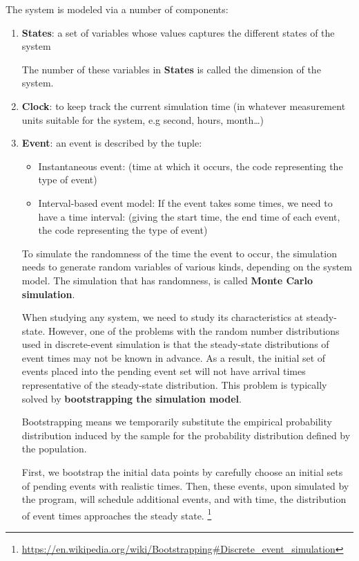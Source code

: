 The system is modeled via a number of components:
\begin{enumerate}
  \item {\bf States}: a set of variables whose values captures the different
  states of the system
  
  The number of these variables in {\bf States} is called the dimension of the
  system.
  
  \item {\bf Clock}:
  to keep track the current simulation time (in whatever measurement units
  suitable for the system, e.g second, hours, month\ldots)
   
  \item {\bf Event}: an event is described by the tuple: 
  \begin{itemize}
    \item Instantaneous event: (time at which it
  occurs, the code representing the type of event)
  
    \item Interval-based event model: 
    If the event takes some times, we need to
    have a time interval:
  (giving the start time, the end time of each event, the code representing the
  type of event)
  \end{itemize}
  
  To simulate the randomness of the time the event to occur, the simulation
  needs to generate random variables of various kinds, depending on the system
  model. The simulation that has randomness, is called {\bf Monte Carlo
  simulation}.
  
  When studying any system, we need to study its characteristics at
  steady-state. However, one of the problems with the random number
  distributions used in discrete-event simulation is that the steady-state
  distributions of event times may not be known in advance. As a result, the
  initial set of events placed into the pending event set will not have arrival
  times representative of the steady-state distribution. This problem is
  typically solved by {\bf bootstrapping the simulation model}.
  
  Bootstrapping means we temporarily substitute the empirical probability
  distribution induced by the sample for the probability distribution defined by
  the population.
  
  First, we bootstrap the initial data points by carefully choose an initial
  sets of pending events with realistic times. Then, these events, upon
  simulated by the program, will schedule additional events, and with time, the
  distribution of event times approaches the steady state.
  \footnote{\url{https://en.wikipedia.org/wiki/Bootstrapping\#Discrete_event_simulation}}
  

\end{enumerate}
